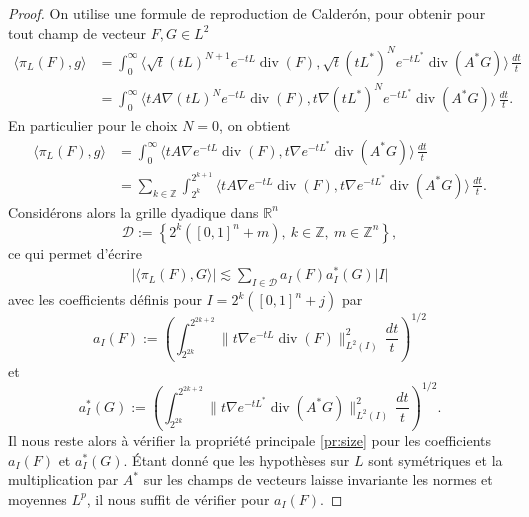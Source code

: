 \documentclass[11pt]{amsart}
\DeclareMathOperator{\dive}{div}
\newcommand{\rr}{\mathbb}
\begin{document}
\begin{proof}
On utilise une formule de reproduction de Calder\'on, pour obtenir pour tout champ de vecteur $F,G\in L^2$
\begin{align*}
 \langle \pi_L(F) , g\rangle & = \int_0^\infty \langle \sqrt{t} (tL)^{N+1} e^{-tL}  \dive(F) ,  \sqrt{t} (tL^*)^N e^{-tL^*} \dive(A^* G) \rangle \, \frac{dt}{t} \\
& = \int_0^\infty \langle tA\nabla (tL)^N e^{-tL}  \dive(F) ,  t\nabla (tL^*)^N e^{-tL^*} \dive(A^* G) \rangle \, \frac{dt}{t}.
\end{align*}
En particulier pour le choix $N=0$, on obtient
 \begin{align*}
 \langle \pi_L(F) , g\rangle &  = \int_0^\infty \langle tA\nabla e^{-tL}  \dive(F) ,  t\nabla e^{-tL^*} \dive(A^* G) \rangle \, \frac{dt}{t} \\
 & = \sum_{k \in {\rr Z}} \int_{2^k}^{2^{k+1}} \langle t A \nabla e^{-tL}  \dive(F) ,  t \nabla e^{-tL^*} \dive(A^* G) \rangle \, \frac{dt}{t}.
 \end{align*}
Consid\'erons alors la grille dyadique dans ${\rr R}^n$
$$ {\mathcal D}:= \left\{2^{k}\left([0,1]^n+m\right), \ k\in {\mathbb Z},\ m\in{\mathbb Z}^n \right\},$$
ce qui permet d'\'ecrire
\begin{align*}
 |\langle \pi_L(F) , G\rangle| \lesssim \sum_{I\in {\mathcal D}} a_I(F) a_I^*(G) |I|
 \end{align*}
avec les coefficients d\'efinis pour $I= 2^k\left([0,1]^n+j\right)$ par
$$ a_I(F) := \left(\int_{2^{2k}}^{2^{2k+2}}  \|t \nabla e^{-tL}  \dive(F) \|_{L^2(I)}^2 \, \frac{dt}{t} \right)^{1/2} $$
et
$$ a_I^*(G) := \left(\int_{2^{2k}}^{2^{2k+2}}  \|t \nabla e^{-tL^*}  \dive(A^* G) \|_{L^2(I)}^2 \, \frac{dt}{t} \right)^{1/2}.$$
Il nous reste alors \`a v\'erifier la propri\'et\'e principale \eqref{pr:size} pour les coefficients $a_I(F)$ et $a_I^* (G)$. \'Etant donn\'e que les hypoth\`eses sur $L$ sont sym\'etriques et la multiplication par $A^*$ sur les champs de vecteurs laisse invariante les normes et moyennes $L^p$, il nous suffit de v\'erifier pour  $a_I(F)$.


\end{proof}
\end{document}
